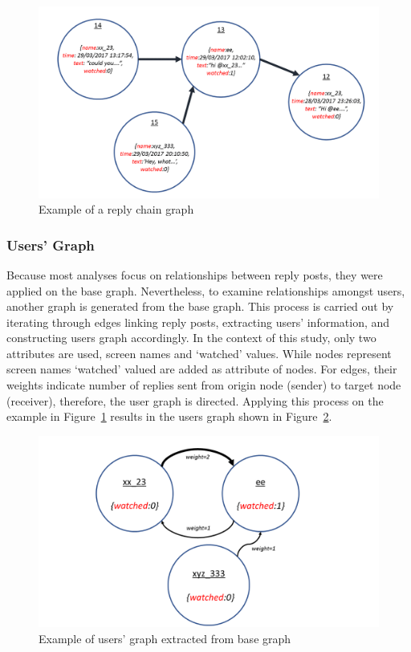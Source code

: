 \documentclass[sigconf]{acmart}
\begin{document}
\begin{figure}[htb]
\centering
\includegraphics[width=\columnwidth]{images/replychaingraph.png}
\caption{Example of a reply chain graph}
\label{fig:replychaingraph}
\end{figure}

\subsubsection{Users' Graph}

Because most analyses focus on relationships between reply posts, they
were applied on the base graph. Nevertheless, to examine relationships
amongst users, another graph is generated from the base graph. This
process is carried out by iterating through edges linking reply posts,
extracting users' information, and constructing users graph
accordingly. In the context of this study, only two attributes are used, 
screen names and `watched' values. While nodes represent screen names 
`watched' valued are added as attribute of nodes. For edges, their weights 
indicate number of replies sent from origin node (sender) to target
node (receiver), therefore, the user graph is directed. Applying this
process on the example in Figure~\ref{fig:replychaingraph} results in
the users graph shown in Figure~\ref{fig:usersgraph}.

\begin{figure}[htb]
\centering
\includegraphics[width=\columnwidth]{images/usersgraph.png}
\caption{Example of users' graph extracted from base graph}
\label{fig:usersgraph}
\end{figure}
\end{document}
